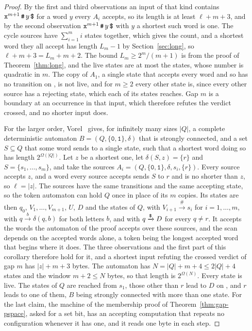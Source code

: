 \documentclass[11pt,a4paper]{article}
\theoremstyle{definition}
\theoremstyle{plain}
\newcommand{\code}[1]{\texttt{#1}}
\begin{document}
\begin{proof}
By the first and third observations an input of that kind contains $\code{x}^{m+1}\, \code{\#}\, y\, \code{\symbol{36}}$
for a word $y$ every $A_i$ accepts, so its length is at least $\ell + m + 3$, and by the second observation
$\code{x}^{m+1}\, \code{\#}\, y\, \code{\symbol{36}}$ with $y$ a shortest such word is one. The cycle sources have
$\sum_{i=1}^{m} i$ states together, which gives the count, and a shortest word they all accept has length $L_m - 1$ by
Section~\ref{sec:long}, so $\ell + m + 3 = L_m + m + 2$. The bound $L_m \geq 2^m / (m + 1)$ is from the proof of
Theorem~\ref{thm:long}, and the live states are at most the states, whose number is quadratic in $m$. The copy of $A_1$,
a single state that accepts every word and so has no transition on \code{}, is not live, and for $m \geq 2$
every other state is, since every other source has a rejecting state, which each of its states reaches. Gap $m$ is a
boundary at an occurrence in that input, which therefore refutes the verdict crossed, and no shorter input does.

For the larger order, Vorel~\cite[Theorem~8, p.~378]{vorel2014subset} gives, for infinitely many sizes $|Q|$, a complete
deterministic automaton $B = (Q, \{\code{0}, \code{1}\}, \delta)$ that is strongly connected, and a set $S \subseteq Q$
that some word sends to a single state, such that a shortest word doing so has length $2^{\Omega(|Q|)}$. Let $z$ be a
shortest one, let $\delta(S, z) = \{r\}$ and $S = \{s_1, \ldots, s_m\}$, and take the sources
$A_i = (Q, \{\code{0}, \code{1}\}, \delta, s_i, \{r\})$. Every source accepts $z$, and a word every source accepts sends
$S$ to $r$ and is no shorter than $z$, so $\ell = |z|$. The sources have the same transitions and the same accepting
state, so the token automaton can hold $Q$ once in place of its $m$ copies. Its states are then $q_0$,
$V_1, \ldots, V_{m+1}$, $U$, $D$ and the states of $Q$, with $V_{i+1} \xrightarrow{\code{\#}} s_i$ for
$i = 1, \ldots, m$, with $q \xrightarrow{b} \delta(q, b)$ for both letters $b$, and with
$q \xrightarrow{\code{\symbol{36}}} D$ for every $q \neq r$. It accepts the words the automaton of the proof accepts
over these sources, and the scan depends on the accepted words alone, a token being the longest accepted word that
begins where it does. The three observations and the first part of this corollary therefore hold for it, and a shortest
input refuting the crossed verdict of gap $m$ has $|z| + m + 3$ bytes. The automaton has
$N = |Q| + m + 4 \leq 2 |Q| + 4$ states and the window $m + 2 \leq N$ bytes, so that length is $2^{\Omega(N)}$. Every
state is live. The states of $Q$ are reached from $s_1$, those other than $r$ lead to $D$ on \code{}, and $r$
leads to one of them, $B$ being strongly connected with more than one state. For the last claim, the machine of the
membership proof of Theorem~\ref{thm:gap-pspace}, asked for a set bit, has an accepting computation that repeats no
configuration whenever it has one, and it reads one byte in each step.
\end{proof}
\end{document}
